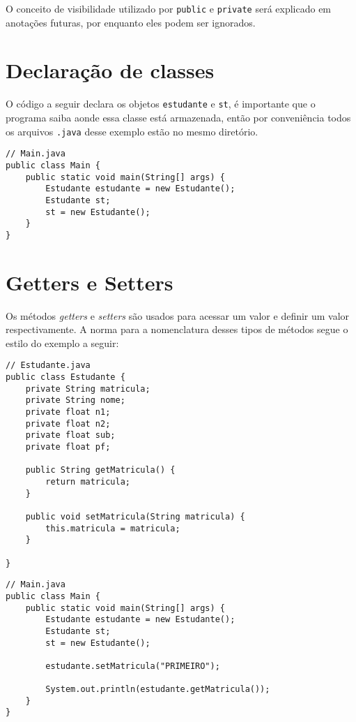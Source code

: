 \documentclass{article}
\begin{document}
\begin{tcolorbox}[colback=yellow!10!white, colframe=yellow!75!black, title=Aviso]
O conceito de visibilidade utilizado por \texttt{public} e \texttt{private} será explicado em anotações futuras, por enquanto eles podem ser ignorados.
\end{tcolorbox}

\clearpage

\section{Declaração de classes}
O código a seguir declara os objetos \texttt{estudante} e \texttt{st}, é importante que o programa saiba aonde essa classe está armazenada, então por conveniência todos os arquivos \texttt{.java} desse exemplo estão no mesmo diretório.
\begin{verbatim}
// Main.java
public class Main {
    public static void main(String[] args) {
        Estudante estudante = new Estudante();
        Estudante st;
        st = new Estudante();
    }
}    
\end{verbatim}

\clearpage

\section{Getters e Setters}
Os métodos \textit{getters} e \textit{setters} são usados para acessar um valor e definir um valor respectivamente. A norma para a nomenclatura desses tipos de métodos segue o estilo do exemplo a seguir:
\begin{verbatim}
// Estudante.java
public class Estudante {
    private String matricula;
    private String nome;
    private float n1;
    private float n2;
    private float sub;
    private float pf;

    public String getMatricula() {
        return matricula;
    }

    public void setMatricula(String matricula) {
        this.matricula = matricula;
    }

}
\end{verbatim}

\begin{verbatim}
// Main.java
public class Main {
    public static void main(String[] args) {
        Estudante estudante = new Estudante();
        Estudante st;
        st = new Estudante();

        estudante.setMatricula("PRIMEIRO");

        System.out.println(estudante.getMatricula());
    }
}

\end{verbatim}
\end{document}
